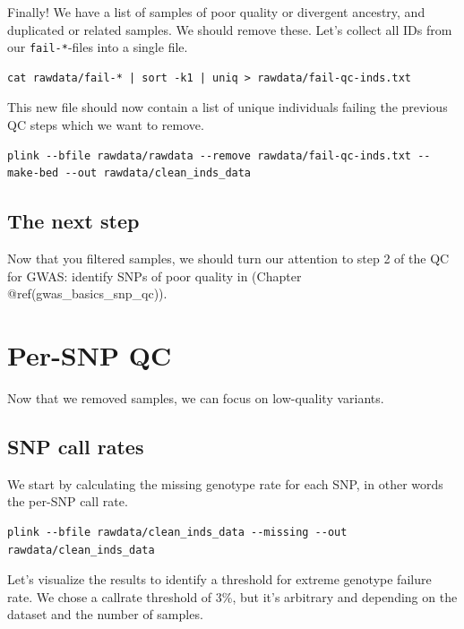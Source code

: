 \documentclass[
]{book}
\begin{document}
Finally! We have a list of samples of poor quality or divergent ancestry, and duplicated or related samples. We should remove these. Let's collect all IDs from our \texttt{fail-*}-files into a single file.

\begin{verbatim}
cat rawdata/fail-* | sort -k1 | uniq > rawdata/fail-qc-inds.txt
\end{verbatim}

This new file should now contain a list of unique individuals failing the previous QC steps which we want to remove.

\begin{verbatim}
plink --bfile rawdata/rawdata --remove rawdata/fail-qc-inds.txt --make-bed --out rawdata/clean_inds_data
\end{verbatim}

\hypertarget{the-next-step}{%
\section{The next step}\label{the-next-step}}

Now that you filtered samples, we should turn our attention to step 2 of the QC for GWAS: identify SNPs of poor quality in (Chapter @ref(gwas\_basics\_snp\_qc)).

\hypertarget{per-snp-qc}{%
\chapter{Per-SNP QC}\label{per-snp-qc}}

Now that we removed samples, we can focus on low-quality variants.

\hypertarget{snp-call-rates}{%
\section{SNP call rates}\label{snp-call-rates}}

We start by calculating the missing genotype rate for each SNP, in other words the per-SNP call rate.

\begin{verbatim}
plink --bfile rawdata/clean_inds_data --missing --out rawdata/clean_inds_data
\end{verbatim}

Let's visualize the results to identify a threshold for extreme genotype failure rate. We chose a callrate threshold of 3\%, but it's arbitrary and depending on the dataset and the number of samples.
\end{document}
